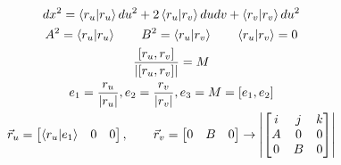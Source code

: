 \documentclass{article}
\begin{document}
\begin{gather*}
  dx ^ {2 } = \bra{r_u }\ket{r_u }du ^2 + 2 \bra{r_u }\ket{r_v }dudv + \bra{r_v}\ket{r_v }du ^2\\
  A ^2 = \bra{r_u }\ket{r_u }\qquad B ^2 = \bra{r_u }\ket{r_v } \qquad \bra{r_u }\ket{r_ v } = 0 \\
  \displaystyle\frac{[r_u,r_v ]}{\left|[r_u,r_v ]\right|} = M \\
  e_1 = \displaystyle\frac{r_u }{\left|r_u \right|}, e_2  = \frac{r_v }{\left|r_v \right|}, e_3  = M = [e_1,e_2]\\
  \vec r_u = \begin{bmatrix} \bra{r_u }\ket{e_1 }  & 0 & 0 \end{bmatrix}, \qquad \vec r_v = \begin{bmatrix} 0  & B  & 0  \end{bmatrix} \rightarrow \left|\begin{bmatrix}
      i & j & k  \\
      A & 0 & 0 \\
      0 & B & 0
  \end{bmatrix}  \right|  
\end{gather*}
\end{document}

